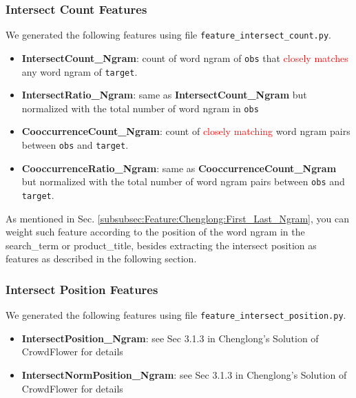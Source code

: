 \documentclass[12pt]{article}
\begin{document}
\subsubsection{Intersect Count Features}
We generated the following features using file \texttt{feature\_intersect\_count.py}.
\begin{itemize}
\item \textbf{IntersectCount\_Ngram}: count of word ngram of \texttt{obs} that \textcolor{red}{closely matches} any word ngram of \texttt{target}.
\item \textbf{IntersectRatio\_Ngram}: same as \textbf{IntersectCount\_Ngram} but normalized with the total number of word ngram in \texttt{obs}
\item \textbf{CooccurrenceCount\_Ngram}: count of \textcolor{red}{closely matching} word ngram pairs between \texttt{obs} and \texttt{target}.
\item \textbf{CooccurrenceRatio\_Ngram}: same as \textbf{CooccurrenceCount\_Ngram} but normalized with the total number of word ngram pairs between \texttt{obs} and \texttt{target}.
\end{itemize}
As mentioned in Sec. \ref{subsubsec:Feature:Chenglong:First_Last_Ngram}, you can weight such feature according to the position of the word ngram in the search\_term or product\_title, besides extracting the intersect position as features as described in the following section.

\subsubsection{Intersect Position Features}
We generated the following features using file \texttt{feature\_intersect\_position.py}.
\begin{itemize}
\item \textbf{IntersectPosition\_Ngram}: see Sec 3.1.3 in Chenglong's Solution of CrowdFlower for details
\item \textbf{IntersectNormPosition\_Ngram}: see Sec 3.1.3 in Chenglong's Solution of CrowdFlower\cite{CrowdFlower_1st} for details
\end{itemize}
\end{document}
